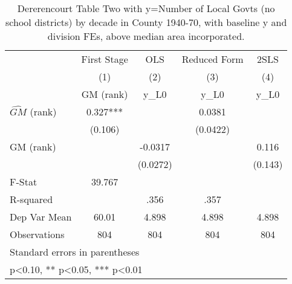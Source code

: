 \begin{table}[htbp]\centering
\def\sym#1{\ifmmode^{#1}\else\(^{#1}\)\fi}
\caption{Dererencourt Table Two with y=Number of Local Govts (no school districts) by decade in County 1940-70, with baseline y and division FEs, above median area incorporated.}
\begin{tabular}{l*{4}{c}}
\toprule
                    & First Stage   &         OLS   &Reduced Form   &        2SLS   \\
                    &\multicolumn{1}{c}{(1)}&\multicolumn{1}{c}{(2)}&\multicolumn{1}{c}{(3)}&\multicolumn{1}{c}{(4)}\\
                    &\multicolumn{1}{c}{GM  (rank)}&\multicolumn{1}{c}{y\_L0}&\multicolumn{1}{c}{y\_L0}&\multicolumn{1}{c}{y\_L0}\\
\midrule
$\hat{GM}$ (rank)   &       0.327***&               &      0.0381   &               \\
                    &     (0.106)   &               &    (0.0422)   &               \\
\addlinespace
GM  (rank)          &               &     -0.0317   &               &       0.116   \\
                    &               &    (0.0272)   &               &     (0.143)   \\
\midrule
F-Stat              &      39.767   &               &               &               \\
R-squared           &               &        .356   &        .357   &               \\
Dep Var Mean        &       60.01   &       4.898   &       4.898   &       4.898   \\
Observations        &         804   &         804   &         804   &         804   \\
\bottomrule
\multicolumn{5}{l}{\footnotesize Standard errors in parentheses}\\
\multicolumn{5}{l}{\footnotesize * p<0.10, ** p<0.05, *** p<0.01}\\
\end{tabular}
\end{table}
